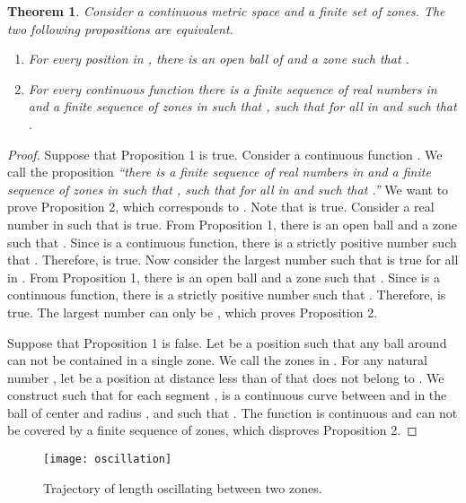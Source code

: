 \documentclass{article}
\newtheorem{theorem}{Theorem}
\begin{document}
\begin{theorem}
Consider a continuous metric space  and a finite set  of zones.
The two following propositions are equivalent.
\begin{enumerate}
\item For every position  in , there is an open ball  of  and a zone  such that .
\item For every continuous function  there is a finite sequence  of real numbers in  and a finite sequence  of zones in  such that , such that for all  in   and such that .
\end{enumerate}
\label{th_oscillation}
\end{theorem}

\begin{proof}
Suppose that Proposition 1 is true. Consider a continuous function . We call  the proposition {\em ``there is a finite sequence  of real numbers in  and a finite sequence  of zones in  such that , such that for all  in   and such that .''} We want to prove Proposition 2, which corresponds to . Note that  is true.
Consider a real number  in  such that  is true. From Proposition 1, there is an open ball  and a zone  such that . Since  is a continuous function, there is a strictly positive number  such that . Therefore,  is true.
Now consider the largest number  such that  is true for all  in . From Proposition 1, there is an open ball  and a zone  such that . Since  is a continuous function, there is a strictly positive number  such that . Therefore,  is true. The largest number  can only be , which proves Proposition 2.

Suppose that Proposition 1 is false. Let  be a position such that any ball around  can not be contained in a single zone. We call  the zones in . For any natural number , let  be a position at distance less than  of  that does not belong to . We construct  such that for each segment ,  is a continuous curve between  and  in the ball of center  and radius , and such that . The function  is continuous and can not be covered by a finite sequence of zones, which disproves Proposition 2.
\end{proof}

\begin{figure}[h]
\begin{center}
\texttt{[image: oscillation]}
\caption{Trajectory of length  oscillating between two zones.}
\label{fig_oscillation}
\end{center}
\end{figure}
\end{document}
